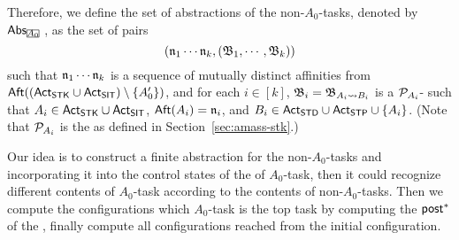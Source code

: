 Therefore, we define the set of abstractions of the non-$A_0$-tasks, denoted by $\abs_{\mhcancel{A_0}}$, as the set of pairs 
\[(\mathfrak{n}_1 \cdots \mathfrak{n}_k, ({\mathfrak{B} }_1, \cdots, {\mathfrak{B} }_k))\]
such that $\mathfrak{n}_1 \cdots \mathfrak{n}_k$ is a sequence of mutually distinct affinities from ${\sf Aft}(({\sf Act}_{{\sf STK}} \cup {\sf Act}_{{\sf SIT}}) \setminus \{A'_0\})$, and for each $i \in [k]$, ${\mathfrak{B} }_i = {\mathfrak{B} }_{A_i \rightsquigarrow B_i}$ is a ${\mathcal{P} }_{A_i}$-{\WOTrNFA} such that $A_i \in {\sf Act}_{\sf STK} \cup {\sf Act}_{\sf SIT}$, ${\sf Aft}(A_i) = \mathfrak{n}_i$, and $B_i \in {\sf Act}_{\sf STD} \cup {\sf Act}_{\sf STP} \cup \{A_i\}$. (Note that ${\mathcal{P} }_{A_i}$ is the {\WOTrPDS} as defined in Section~\ref{sec:amass-stk}.) 




Our idea is to construct a finite abstraction for the non-$A_0$-tasks and incorporating it into the control states of the {\WOTrPDS} of $A_0$-task, then it could recognize different contents of $A_0$-task according to the contents of non-$A_0$-tasks.
Then we compute the configurations which $A_0$-task is the top task by computing the ${\mathsf{post} }^*$ of the {\WOTrPDS}, finally compute all configurations reached from the initial configuration.



